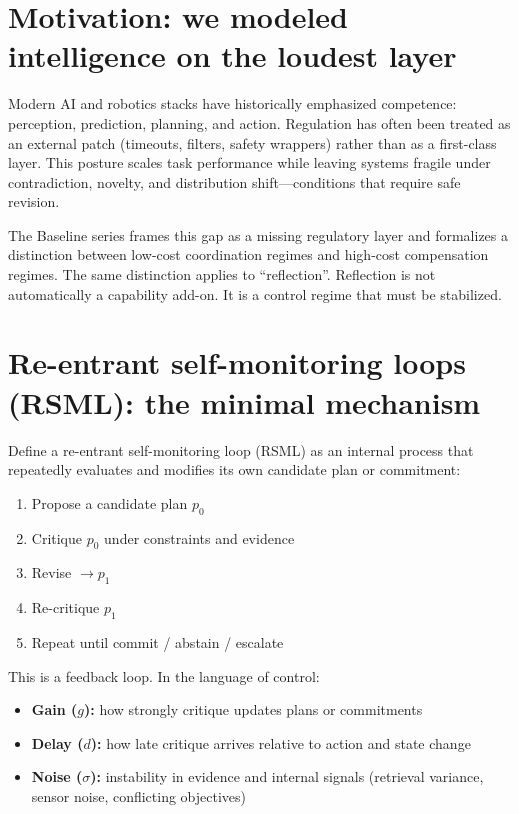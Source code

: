 \documentclass[11pt]{article}
\begin{document}
\section{Motivation: we modeled intelligence on the loudest layer}
Modern AI and robotics stacks have historically emphasized competence: perception, prediction, planning,
and action. Regulation has often been treated as an external patch (timeouts, filters, safety wrappers) rather
than as a first-class layer. This posture scales task performance while leaving systems fragile under
contradiction, novelty, and distribution shift—conditions that require safe revision.

The Baseline series frames this gap as a missing regulatory layer and formalizes a distinction between
low-cost coordination regimes and high-cost compensation regimes. The same distinction applies to
\enquote{reflection}. Reflection is not automatically a capability add-on. It is a control regime that must be
stabilized.

\section{Re-entrant self-monitoring loops (RSML): the minimal mechanism}
Define a re-entrant self-monitoring loop (RSML) as an internal process that repeatedly evaluates and
modifies its own candidate plan or commitment:

\begin{enumerate}
  \item Propose a candidate plan $p_0$
  \item Critique $p_0$ under constraints and evidence
  \item Revise $\rightarrow p_1$
  \item Re-critique $p_1$
  \item Repeat until commit / abstain / escalate
\end{enumerate}

This is a feedback loop. In the language of control:
\begin{itemize}
  \item \textbf{Gain ($g$):} how strongly critique updates plans or commitments
  \item \textbf{Delay ($d$):} how late critique arrives relative to action and state change
  \item \textbf{Noise ($\sigma$):} instability in evidence and internal signals (retrieval variance, sensor noise,
        conflicting objectives)
\end{itemize}
\end{document}
